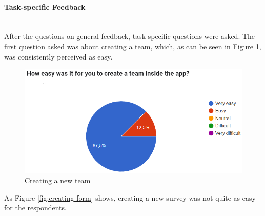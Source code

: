 \documentclass[11pt]{article}
\begin{document}
\paragraph{Task-specific Feedback}\mbox{}\\
After the questions on general feedback, task-specific questions were asked. The first question asked was about creating a team, which, as can be seen in Figure \ref{fig:creating team}, was consistently perceived as easy.\\
\begin{figure}[h!]
    \centering
    \includegraphics[width=0.8\linewidth]{figures/creating team.PNG}
    \caption{Creating a new team}
    \label{fig:creating team}
\end{figure}
As Figure \ref{fig:creating form} shows, creating a new survey was not quite as easy for the respondents.
\end{document}
